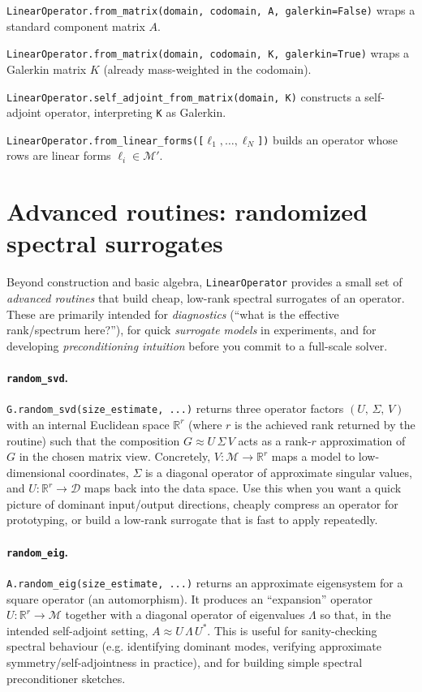 \documentclass[11pt,twoside,openright]{book}
\theoremstyle{plain}
\theoremstyle{definition}
\theoremstyle{remark}
\newcommand{\modelspace}{\mathcal{M}}
\newcommand{\dataspace}{\mathcal{D}}
\begin{document}
\begin{codebox}
\texttt{LinearOperator.from\_matrix(domain, codomain, A, galerkin=False)}
wraps a standard component matrix $A$.

\texttt{LinearOperator.from\_matrix(domain, codomain, K, galerkin=True)}
wraps a Galerkin matrix $K$ (already mass-weighted in the codomain).

\texttt{LinearOperator.self\_adjoint\_from\_matrix(domain, K)}
constructs a self-adjoint operator, interpreting \texttt{K} as Galerkin.

\texttt{LinearOperator.from\_linear\_forms([$\ell_1, \ldots, \ell_N$])}
builds an operator whose rows are linear forms $\ell_i\in\modelspace'$.
\end{codebox}

\section{Advanced routines: randomized spectral surrogates}
\label{sec:linear-operator-advanced-routines}

Beyond construction and basic algebra, \texttt{LinearOperator} provides a small
set of \emph{advanced routines} that build cheap, low-rank spectral surrogates
of an operator. These are primarily intended for \emph{diagnostics} (``what is
the effective rank/spectrum here?''), for quick \emph{surrogate models} in
experiments, and for developing \emph{preconditioning intuition} before you
commit to a full-scale solver.

\paragraph{\texttt{random\_svd}.}
\texttt{G.random\_svd(size\_estimate, ...)} returns three operator factors
\((U,\,\Sigma,\,V)\) with an internal Euclidean space $\mathbb{R}^r$ (where $r$
is the achieved rank returned by the routine) such that
the composition
\(G \approx U\,\Sigma\,V\)
acts as a rank-$r$ approximation of $G$ in the chosen matrix view.
Concretely, $V:\modelspace\to\mathbb{R}^r$ maps a model to low-dimensional
coordinates, $\Sigma$ is a diagonal operator of approximate singular values, and
$U:\mathbb{R}^r\to\dataspace$ maps back into the data space.
Use this when you want a quick picture of dominant input/output directions,
cheaply compress an operator for prototyping, or build a low-rank surrogate that
is fast to apply repeatedly.

\paragraph{\texttt{random\_eig}.}
\texttt{A.random\_eig(size\_estimate, ...)} returns an approximate eigensystem for a square
operator (an automorphism). It produces an ``expansion'' operator
\(U:\mathbb{R}^r\to\modelspace\) together with a diagonal operator of
eigenvalues $\Lambda$ so that, in the intended self-adjoint setting,
\(A \approx U\,\Lambda\,U^*\).
This is useful for sanity-checking spectral behaviour (e.g. identifying dominant
modes, verifying approximate symmetry/self-adjointness in practice), and for
building simple spectral preconditioner sketches.
\end{document}
